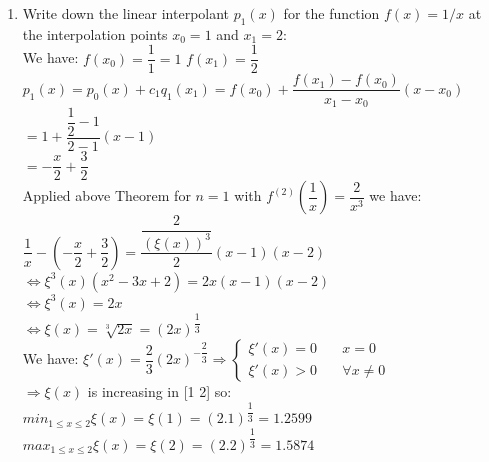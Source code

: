\documentclass[14pt,a4paper]{article}
\begin{document}
\begin{enumerate}
	\item Write down the linear interpolant $p_1(x)$ for the function  $f(x) = 1/x$ at the interpolation points $x_0 = 1$ and $x_1 = 2$:\\
		We have: \hspace{1cm} $ f(x_0) = \dfrac{1}{1} = 1$ \hspace{1cm} $f(x_1) = \dfrac{1}{2}$ \\
		\hspace*{2cm} $p_1(x) = p_0(x) + c_1q_1(x_1)= f(x_0) + \dfrac{f(x_1) - f(x_0)}{x_1 - x_0} (x - x_0) $\\
		\hspace*{6.45cm} $ = 1 + \dfrac{\dfrac{1}{2} - 1}{2 - 1}(x-1) $ \\
		\hspace*{6.45cm} $ = -\dfrac{x}{2} + \dfrac{3}{2} $\\
		Applied above Theorem for $n =1$ with $f^{(2)}(\dfrac{1}{x}) = \dfrac{2}{x^3}$ we have:\\
		\hspace*{2cm} $ \dfrac{1}{x} - \left(-\dfrac{x}{2} + \dfrac{3}{2}\right) = \dfrac{\dfrac{2}{(\xi(x))^3}}{2}(x-1)(x-2)$ \\
		\hspace*{2cm} $ \Leftrightarrow \xi^3(x)(x^2 - 3x +2) = 2x(x-1)(x-2)$ \\
		\hspace*{2cm} $ \Leftrightarrow \xi^3(x) = 2x$\\
		\hspace*{2cm} $ \Leftrightarrow \xi(x) = \sqrt[3]{2x} = (2x)^{\dfrac{1}{3}}$ \\
		We have: $\xi'(x) = \dfrac{2}{3}(2x)^{-\dfrac{2}{3}} \Rightarrow \begin{cases} \xi'(x) = 0 & \quad  x =0 \\ \xi'(x) > 0 & \quad \forall x \neq 0 \end{cases} $ \\
		\hspace*{1cm} $ \Rightarrow \xi(x)$  is increasing in [1  2] so:\\
		\hspace*{2cm} $min_{1 \leq x \leq 2}\xi(x) = \xi(1) = (2.1)^{\dfrac{1}{3}}= 1.2599$ \\
		\hspace*{2cm} $max_{1 \leq x \leq 2}\xi(x) = \xi(2) = (2.2)^{\dfrac{1}{3}} = 1.5874$ 
\end{enumerate}
\end{document}
